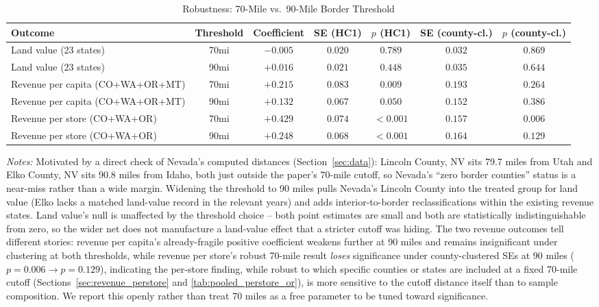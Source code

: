 \begin{table}[htbp]
\centering
\caption{Robustness: 70-Mile vs.\ 90-Mile Border Threshold}
\label{tab:threshold_sensitivity}
\begin{tabular}{lcccccc}
\toprule
Outcome & Threshold & Coefficient & SE (HC1) & $p$ (HC1) & SE (county-cl.) & $p$ (county-cl.) \\
\midrule
Land value (23 states) & 70mi & $-0.005$ & $0.020$ & $0.789$ & $0.032$ & $0.869$ \\
Land value (23 states) & 90mi & $+0.016$ & $0.021$ & $0.448$ & $0.035$ & $0.644$ \\
\midrule
Revenue per capita (CO+WA+OR+MT) & 70mi & $+0.215$ & $0.083$ & $0.009$ & $0.193$ & $0.264$ \\
Revenue per capita (CO+WA+OR+MT) & 90mi & $+0.132$ & $0.067$ & $0.050$ & $0.152$ & $0.386$ \\
\midrule
Revenue per store (CO+WA+OR) & 70mi & $+0.429$ & $0.074$ & $<0.001$ & $0.157$ & $0.006$ \\
Revenue per store (CO+WA+OR) & 90mi & $+0.248$ & $0.068$ & $<0.001$ & $0.164$ & $0.129$ \\
\bottomrule
\end{tabular}
\begin{minipage}{0.95\textwidth}
\vspace{0.3em}
\footnotesize
\textit{Notes:} Motivated by a direct check of Nevada's computed distances (Section~\ref{sec:data}):
Lincoln County, NV sits 79.7 miles from Utah and Elko County, NV sits 90.8 miles from Idaho, both just
outside the paper's 70-mile cutoff, so Nevada's ``zero border counties'' status is a near-miss rather than
a wide margin. Widening the threshold to 90 miles pulls Nevada's Lincoln County into the treated group for
land value (Elko lacks a matched land-value record in the relevant years) and adds interior-to-border
reclassifications within the existing revenue states. Land value's null is unaffected by the threshold
choice -- both point estimates are small and both are statistically indistinguishable from zero, so the
wider net does not manufacture a land-value effect that a stricter cutoff was hiding. The two revenue
outcomes tell different stories: revenue per capita's already-fragile positive coefficient weakens further
at 90 miles and remains insignificant under clustering at both thresholds, while revenue per store's
robust 70-mile result \emph{loses} significance under county-clustered SEs at 90 miles ($p=0.006\to
p=0.129$), indicating the per-store finding, while robust to which specific counties or states are
included at a fixed 70-mile cutoff (Sections~\ref{sec:revenue_perstore} and
\ref{tab:pooled_perstore_or}), is more sensitive to the cutoff distance itself than to sample composition.
We report this openly rather than treat 70 miles as a free parameter to be tuned toward significance.
\end{minipage}
\end{table}
